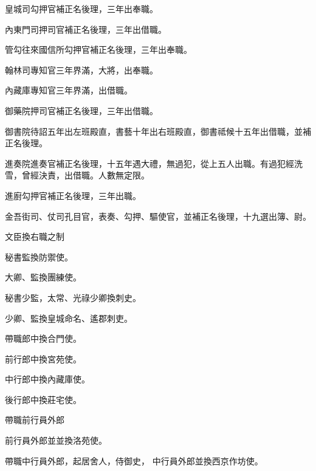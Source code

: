 \begin{pinyinscope}
 皇城司勾押官補正名後理，三年出奉職。



 內東門司押司官補正名後理，三年出借職。



 管勾往來國信所勾押官補正名後理，三年出奉職。



 翰林司專知官三年界滿，大將，出奉職。



 內藏庫專知官三年界滿，出借職。



 御藥院押司官補正名後理，三年出借職。



 御書院待詔五年出左班殿直，書藝十年出右班殿直，御書祗候十五年出借職，並補正名後理。



 進奏院進奏官補正名後理，十五年遇大禮，無過犯，從上五人出職。有過犯經洗雪，曾經決責，出借職。人數無定限。



 進廚勾押官補正名後理，三年出職。



 金吾街司、仗司孔目官，表奏、勾押、驅使官，並補正名後理，十九選出簿、尉。



 文臣換右職之制



 秘書監換防禦使。



 大卿、監換團練使。



 秘書少監，太常、光祿少卿換刺史。



 少卿、監換皇城命名、遙郡刺吏。



 帶職郎中換合門使。



 前行郎中換宮苑使。



 中行郎中換內藏庫使。



 後行郎中換莊宅使。



 帶職前行員外郎



 前行員外郎並並換洛苑使。



 帶職中行員外郎，起居舍人，侍御史，
 中行員外郎並換西京作坊使。




\end{pinyinscope}

